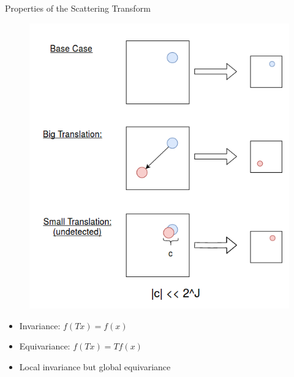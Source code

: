 \documentclass[compress]{beamer}
\begin{document}
	\begin{frame}{Properties of the Scattering Transform}
		\begin{minipage}[c]{0.67\textwidth}
		\begin{figure}
			\centering
			\includegraphics[width=\textwidth]{images/equiv_inv.png}
		\end{figure}
		\end{minipage}\hfill
		\begin{minipage}[c]{0.3\textwidth}
			\begin{itemize}
				\item Invariance: $f(Tx) = f(x)$
				\item Equivariance: $f(Tx) = Tf(x)$
				\item Local invariance but global equivariance 
			\end{itemize}			
		\end{minipage}
	\end{frame}
\end{document}
